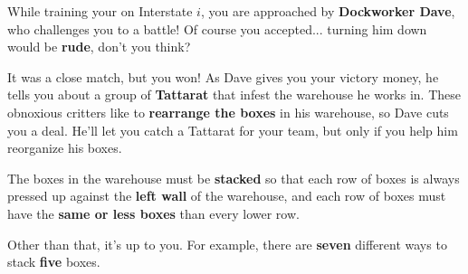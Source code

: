

\newcommand{\mappBoxRow}[2]{
  \fill[color=lightgray] #1 rectangle #2;
  \draw[step=1]          #1 grid #2;
}


While training your \mappMobimon{} on Interstate \(i\), you are approached
by \textbf{Dockworker Dave}, who challenges you to a \mappMobimon{} battle!
Of course you accepted... turning him down would be \textbf{rude},
don't you think?

It was a close match, but you won! As Dave gives you your victory money, he
tells you about a group of \textbf{Tattarat} \mappMobimon{} that infest the
warehouse he works in. These obnoxious critters like to
\textbf{rearrange the boxes} in his warehouse, so Dave cuts you a deal.
He'll let you catch a Tattarat for your team, but only if you help
him reorganize his boxes.

The boxes in the warehouse must be \textbf{stacked} so that
each row of boxes is always pressed up against the \textbf{left wall} of the
warehouse, and each row of boxes must have the \textbf{same or less boxes} than
every lower row.

Other than that, it's up to you. For example, there are \textbf{seven}
different ways to stack \textbf{five} boxes.

